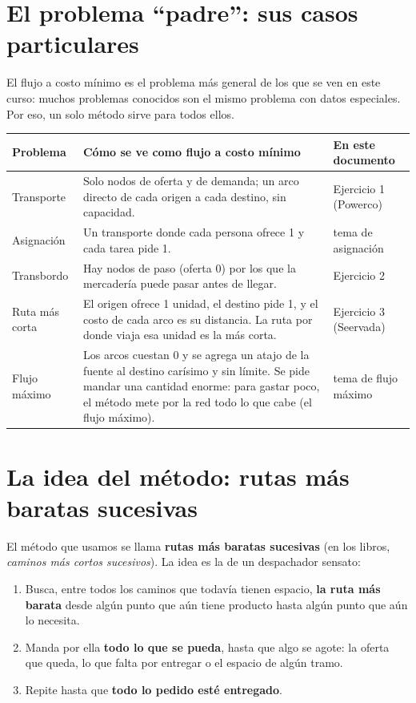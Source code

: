 \documentclass[11pt,a4paper]{article}
\begin{document}
\section{El problema ``padre'': sus casos particulares}

El flujo a costo mínimo es el problema más general de los que se ven en este curso: muchos problemas conocidos
son el mismo problema con datos especiales. Por eso, un solo método sirve para todos ellos.

\begin{center}\small
\begin{tabular}{p{2.9cm}p{7.1cm}p{4.2cm}}
\toprule
\textbf{Problema} & \textbf{Cómo se ve como flujo a costo mínimo} & \textbf{En este documento} \\
\midrule
Transporte & Solo nodos de oferta y de demanda; un arco directo de cada origen a cada destino, sin capacidad. & Ejercicio 1 (Powerco) \\
Asignación & Un transporte donde cada persona ofrece 1 y cada tarea pide 1. & tema de asignación \\
Transbordo & Hay nodos de paso (oferta 0) por los que la mercadería puede pasar antes de llegar. & Ejercicio 2 \\
Ruta más corta & El origen ofrece 1 unidad, el destino pide 1, y el costo de cada arco es su distancia. La
                 ruta por donde viaja esa unidad es la más corta. & Ejercicio 3 (Seervada) \\
Flujo máximo & Los arcos cuestan 0 y se agrega un atajo de la fuente al destino carísimo y sin límite. Se pide mandar
               una cantidad enorme: para gastar poco, el método mete por la red todo lo que cabe (el flujo máximo). & tema de flujo máximo \\
\bottomrule
\end{tabular}
\end{center}

\section{La idea del método: rutas más baratas sucesivas}

El método que usamos se llama \textbf{rutas más baratas sucesivas} (en los libros, \emph{caminos más cortos
sucesivos}). La idea es la de un despachador sensato:

\begin{enumerate}[itemsep=3pt]
  \item Busca, entre todos los caminos que todavía tienen espacio, \textbf{la ruta más barata} desde algún punto que
        aún tiene producto hasta algún punto que aún lo necesita.
  \item Manda por ella \textbf{todo lo que se pueda}, hasta que algo se agote: la oferta que queda, lo que falta
        por entregar o el espacio de algún tramo.
  \item Repite hasta que \textbf{todo lo pedido esté entregado}.
\end{enumerate}
\end{document}
